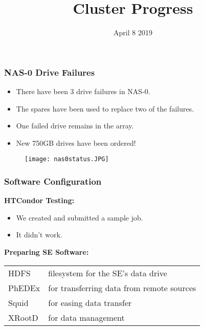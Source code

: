 \documentclass{beamer}
\title{Cluster Progress}
\date{April 8 2019}
\begin{document}

\begin{frame}
  \maketitle
\end{frame}



\begin{frame}

  \frametitle{NAS-0 Drive Failures}

  \begin{itemize}
    \item There have been 3 drive failures in NAS-0.
    \item The spares have been used to replace two of the failures.
    \item One failed drive remains in the array.
    \item New 750GB drives have been ordered!
  \end{itemize}

  \begin{figure}[H]
    \begin{center}
      \texttt{[image: nas0status.JPG]}
    \end{center}
  \end{figure}

\end{frame}



\begin{frame}

  \frametitle{Software Configuration}

    \textbf{HTCondor Testing:}

    \begin{itemize}
    \item We created and submitted a sample job.
    \item It didn't work.
    \end{itemize}


    \textbf{Preparing SE Software:}

    \begin{center}
      \begin{tabular}{|l|l|}
        \hline
        HDFS & filesystem for the SE's data drive \\
        PhEDEx & for transferring data from remote sources \\
        Squid & for easing data transfer \\
        XRootD & for data management \\
        \hline
      \end{tabular}
    \end{center}

\end{frame}

\end{document}
